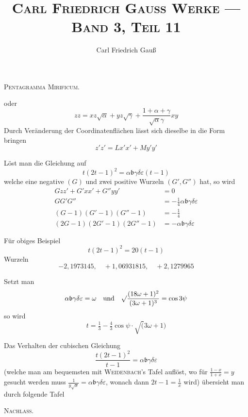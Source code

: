 \documentclass[12pt,a4paper]{article}
\title{\vspace{-2cm}\Large\textsc{Carl Friedrich Gau\ss{} Werke --- Band 3, Teil 11}}
\author{Carl Friedrich Gau\ss}
\date{}
\begin{document}
\maketitle
\thispagestyle{empty}
\vspace{-1cm}

\begin{center}
\textsc{Pentagramma Mirificum.}
\end{center}

\vspace{0.5em}

\noindent
oder
\[
zz = xz\surd\alpha + yz\surd\gamma + \frac{1+\alpha+\gamma}{\surd\alpha\gamma}xy
\]
Durch Veränderung der Coordinatenfl\"achen l\"asst sich dieselbe in die Form bringen
\[
z'z' = Lx'x' + My'y'
\]

L\"ost man die Gleichung auf
\[
t(2t-1)^2 = \alpha\mathfrak{b}\gamma\delta\varepsilon(t-1)
\]
welche eine negative $(G)$ und zwei positive Wurzeln $(G', G'')$ hat, so wird
\begin{align*}
Gzz' + G'xx' + G''yy' &= 0 \\
GG'G'' &= -\tfrac{1}{4}\alpha\mathfrak{b}\gamma\delta\varepsilon \\
(G-1)(G'-1)(G''-1) &= -\tfrac{1}{4} \\
(2G-1)(2G'-1)(2G''-1) &= -\alpha\mathfrak{b}\gamma\delta\varepsilon
\end{align*}

F\"ur obiges Beispiel
\[
t(2t-1)^2 = 20(t-1)
\]
Wurzeln
\[
-2{,}1973145, \quad +1{,}06931815, \quad +2{,}1279965
\]

Setzt man
\[
\alpha\mathfrak{b}\gamma\delta\varepsilon = \omega \quad\text{und}\quad
\surd\frac{(18\omega+1)^2}{(3\omega+1)^3} = \cos 3\psi
\]
so wird
\[
t = \tfrac{1}{3} - \tfrac{4}{3}\cos\psi \cdot \surd(3\omega+1)
\]

Das Verhalten der cubischen Gleichung
\[
\frac{t(2t-1)^2}{t-1} = \alpha\mathfrak{b}\gamma\delta\varepsilon
\]
(welche man am bequemsten mit \textsc{Weidenbach}'s Tafel aufl\"ost, wo f\"ur $\frac{1-x}{1+x}=y$
gesucht werden muss $\frac{1}{y\surd x} = \alpha\mathfrak{b}\gamma\delta\varepsilon$, wonach dann $2t-1 = \frac{1}{x}$ wird) \"ubersieht man durch folgende Tafel

\vspace{1em}

\begin{center}
\textsc{Nachlass.}
\end{center}
\end{document}
